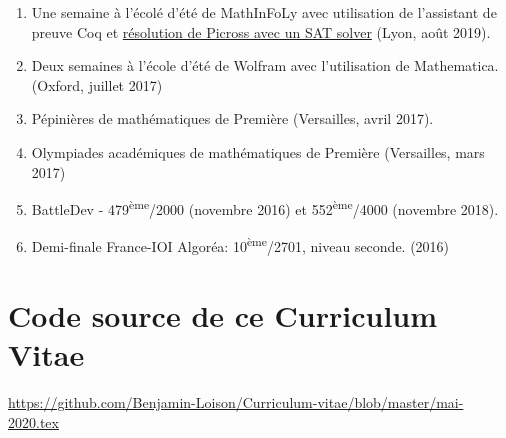\documentclass{article}
\begin{document}
		\begin{enumerate}
			
			\item Une semaine à l'écolé d'été de MathInFoLy avec utilisation de l'assistant de preuve Coq et \href{https://github.com/Benjamin-Loison/MathInFoLy19}{résolution de Picross avec un SAT solver} (Lyon, août 2019).
			
			\item Deux semaines à l'école d'été de Wolfram avec l'utilisation de Mathematica. (Oxford, juillet 2017)
			
			\item Pépinières de mathématiques de Première (Versailles, avril 2017).
			
			\item Olympiades académiques de mathématiques de Première (Versailles, mars 2017)
			
			\item BattleDev - 479\textsuperscript{ème}/2000 (novembre 2016) et 552\textsuperscript{ème}/4000 (novembre 2018).
			
			\item Demi-finale France-IOI Algoréa: 10\textsuperscript{ème}/2701, niveau seconde. (2016)

		\end{enumerate}
		
		\section{Code source de ce Curriculum Vitae}
	
		\href{https://github.com/Benjamin-Loison/Curriculum-vitae/blob/master/mai-2020.tex}{https://github.com/Benjamin-Loison/Curriculum-vitae/blob/master/mai-2020.tex}
	
\end{document}
